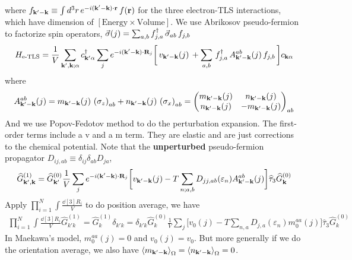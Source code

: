 \documentclass[]{article}
\begin{document}
where $f_{\vb{k}'-\vb{k}}\equiv\int d^3r\,e^{-i(\vb{k}'-\vb{k})\cdot\vb{r}}\,f(\vb{r})$ for the three electron-TLS interactions, which have dimension of $[\text{Energy}\times\text{Volume}]$.
We use Abrikosov pseudo-fermion to factorize spin operators, $\va{\sigma}(j)=\sum_{a,b}f^{\dag}_{j,a}\,\va{\sigma}_{ab}\,f_{j,b}$
\begin{eqnarray}
    \label{eq-H_electron_pseudo_fermion}
    H_{\text{e-TLS}} 
    = \frac{1}{V}
    \sum_{\vb{k}',\vb{k};\alpha}
    c^\dagger_{\vb{k}'\alpha}\sum_{j} 
    e^{-i(\vb{k}'-\vb{k})\cdot\vb{R}_j}
    \bigg[\,v_{\vb{k}'-\vb{k}}(j)\,
    + 
    \sum_{a,b}
    \,f^{\dag}_{j,a}\,A_{\vb{k}'-\vb{k}}^{ab}(j)\,f_{j,b}\,
    \bigg]c_{\vb{k}\alpha}
\end{eqnarray}
where
\begin{align}
    A_{\vb{k}'-\vb{k}}^{ab}(j)
    =
    m_{\vb{k}'-\vb{k}}(j)\,\left(\sigma_z\right)_{ab} 
    + 
    n_{\vb{k}'-\vb{k}}(j)\,\left(\sigma_x\right)_{ab}
    =\begin{pmatrix}
        m_{\vb{k}'-\vb{k}}(j) & n_{\vb{k}'-\vb{k}}(j) \\
        n_{\vb{k}'-\vb{k}}(j) & -m_{\vb{k}'-\vb{k}}(j)
    \end{pmatrix}_{ab}
\end{align}
And we use Popov-Fedotov method to do the perturbation expansion.
The first-order terms include a v and a m term.
They are elastic and are just corrections to the chemical potential.
Note that the \textbf{unperturbed} pseudo-fermion propagator $D_{ij,ab}\equiv\delta_{ij}\delta_{ab}D_{ja}$,
\begin{align}
  \widehat{G}^{(1)}_{\vb{k}',\vb{k}} = 
  \widehat{G}^{(0)}_{\vb{k}'}
  \frac{1}{V}\sum_j
  e^{-i(\vb{k}'-\vb{k})\cdot\vb{R}_j}
  \bigg[
    v_{\vb{k}'-\vb{k}}(j) - T\sum_{n;a,b}D_{jj,ab}(\varepsilon_n)A^{ab}_{\vb{k}'-\vb{k}}(j)
  \bigg]\widehat{\tau}_3
  \widehat{G}^{(0)}_{\vb{k}}
\end{align}
Apply $\prod_{i=1}^{N}\int\frac{\dd[3]{R_i}}{V}$ to do position average, we have
\begin{align}
  \prod_{i=1}^{N}\int\frac{\dd[3]{R_i}}{V}
  \widehat{G}^{(1)}_{k'k} = 
  \widehat{G}^{(1)}_{k}\delta_{k'k} = \delta_{k'k}
  \widehat{G}^{(0)}_{k}
  \frac{1}{V}\sum_j
  \bigg[
    v_0(j) - T\sum_{n,a}D_{j,a}(\varepsilon_n)m^{aa}_0(j)
  \bigg]\widehat{\tau}_3
  \widehat{G}^{(0)}_k
\end{align}
In Maekawa's model, $m^{aa}_0(j)=0$ and $v_0(j)=v_0$.
But more generally if we do the orientation average, we also have
$\ev{m_{\vb{k}'-\vb{k}}}_\Omega=\ev{n_{\vb{k}'-\vb{k}}}_\Omega=0$.
\end{document}

